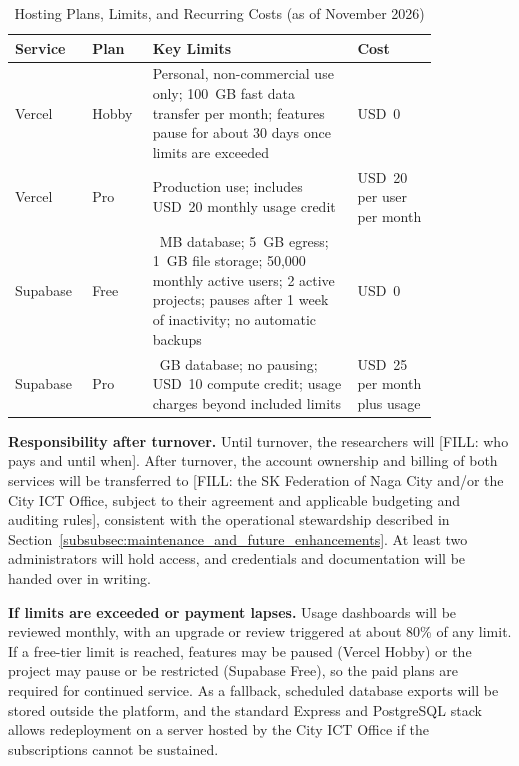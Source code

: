 \begin{table}[H]
\centering
\footnotesize
\caption{Hosting Plans, Limits, and Recurring Costs (as of November 2026)}
\label{tab:hosting_plans_costs}
\begin{tabular}{|>{\raggedright\arraybackslash}p{0.12\linewidth}|>{\raggedright\arraybackslash}p{0.12\linewidth}|>{\raggedright\arraybackslash}p{0.43\linewidth}|>{\raggedright\arraybackslash}p{0.17\linewidth}|}
\hline
\textbf{Service} & \textbf{Plan} & \textbf{Key Limits} & \textbf{Cost} \\ \hline
Vercel & Hobby & Personal, non-commercial use only; 100~GB fast data transfer per month; features pause for about 30 days once limits are exceeded & USD~0 \\ \hline
Vercel & Pro & Production use; includes USD~20 monthly usage credit & USD~20 per user per month \\ \hline
Supabase & Free & 500~MB database; 5~GB egress; 1~GB file storage; 50,000 monthly active users; 2 active projects; pauses after 1 week of inactivity; no automatic backups & USD~0 \\ \hline
Supabase & Pro & 8~GB database; no pausing; USD~10 compute credit; usage charges beyond included limits & USD~25 per month plus usage \\ \hline
\end{tabular}
\end{table}

\hspace*{\parindent}\textbf{Responsibility after turnover.} Until turnover, the researchers will [FILL: who pays and until when]. After turnover, the account ownership and billing of both services will be transferred to [FILL: the SK Federation of Naga City and/or the City ICT Office, subject to their agreement and applicable budgeting and auditing rules], consistent with the operational stewardship described in Section~\ref{subsubsec:maintenance_and_future_enhancements}. At least two administrators will hold access, and credentials and documentation will be handed over in writing.

\hspace*{\parindent}\textbf{If limits are exceeded or payment lapses.} Usage dashboards will be reviewed monthly, with an upgrade or review triggered at about 80\% of any limit. If a free-tier limit is reached, features may be paused (Vercel Hobby) or the project may pause or be restricted (Supabase Free), so the paid plans are required for continued service. As a fallback, scheduled database exports will be stored outside the platform, and the standard Express and PostgreSQL stack allows redeployment on a server hosted by the City ICT Office if the subscriptions cannot be sustained.


